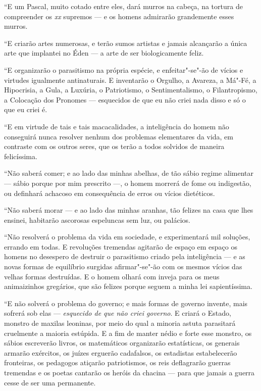 ``E um Pascal, muito cotado entre eles, dará murros na cabeça, na
tortura de compreender os \emph{xx} supremos --- e os homens admirarão
grandemente esses murros.

``E criarão artes numerosas, e terão sumos artistas e jamais alcançarão
a única arte que implantei no Éden --- a arte de ser biologicamente
feliz.

``E organizarão o parasitismo na própria espécie, e enfeitar"-se"-ão de
vícios e virtudes igualmente antinaturais. E inventarão o Orgulho, a
Avareza, a Má"-Fé, a Hipocrisia, a Gula, a Luxúria, o Patriotismo, o
Sentimentalismo, o Filantropismo, a Colocação dos Pronomes ---
esquecidos de que eu não criei nada disso e só o que eu criei é.

``E em virtude de tais e tais macacalidades, a inteligência do homem não
conseguirá nunca resolver nenhum dos problemas elementares da vida, em
contraste com os outros seres, que os terão a todos solvidos de maneira
felicíssima.

``Não saberá comer; e ao lado das minhas abelhas, de tão sábio regime
alimentar --- sábio porque por mim prescrito ---, o homem morrerá de
fome ou indigestão, ou definhará achacoso em consequência de erros ou
vícios dietéticos.

``Não saberá morar --- e ao lado das minhas aranhas, tão felizes na casa
que lhes ensinei, habitarão ascorosas espeluncas sem luz, ou palácios.

``Não resolverá o problema da vida em sociedade, e experimentará mil
soluções, errando em todas. E revoluções tremendas agitarão de espaço em
espaço os homens no desespero de destruir o parasitismo criado pela
inteligência --- e as novas formas de equilíbrio surgidas afirmar"-se"-ão
com os mesmos vícios das velhas formas destruídas. E o homem olhará com
inveja para os meus animaizinhos gregários, que são felizes porque
seguem a minha lei sapientíssima.

``E não solverá o problema do governo; e mais formas de governo invente,
mais sofrerá sob elas --- \emph{esquecido de que não criei governo}. E
criará o Estado, monstro de maxilas leoninas, por meio do qual a minoria
astuta parasitará cruelmente a maioria estúpida. E a fim de manter nédio
e forte esse monstro, os sábios escreverão livros, os matemáticos
organizarão estatísticas, os generais armarão exércitos, os juízes
erguerão cadafalsos, os estadistas estabelecerão fronteiras, os
pedagogos atiçarão patriotismos, os reis deflagrarão guerras tremendas e
os poetas cantarão os heróis da chacina --- para que jamais a guerra
cesse de ser uma permanente.

